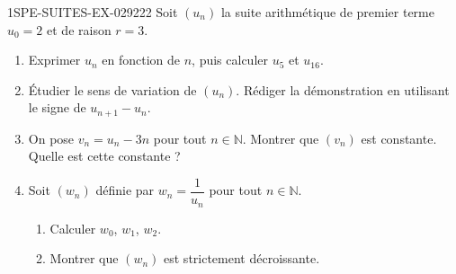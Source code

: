 \begin{exercice}{1SPE-SUITES-EX-029}{2}{22}
Soit $(u_n)$ la suite arithmétique de premier terme $u_0 = 2$ et de raison $r = 3$.

\begin{enumerate}
  \item Exprimer $u_n$ en fonction de $n$, puis calculer $u_5$ et $u_{16}$.

  \item Étudier le sens de variation de $(u_n)$. Rédiger la démonstration en utilisant le signe de $u_{n+1} - u_n$.

  \item On pose $v_n = u_n - 3n$ pour tout $n \in \mathbb{N}$. Montrer que $(v_n)$ est constante. Quelle est cette constante ?

  \item Soit $(w_n)$ définie par $w_n = \dfrac{1}{u_n}$ pour tout $n \in \mathbb{N}$.
  \begin{enumerate}
    \item Calculer $w_0$, $w_1$, $w_2$.
    \item Montrer que $(w_n)$ est strictement décroissante.
  \end{enumerate}
\end{enumerate}
\end{exercice}
